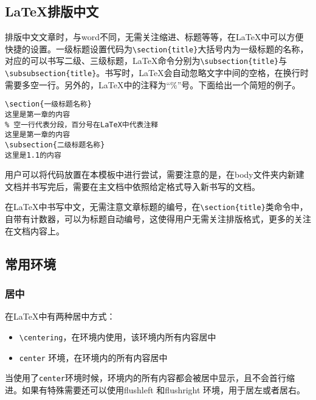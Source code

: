 \subsection{\LaTeX 排版中文}
排版中文文章时，与word不同，无需关注缩进、标题等等，在\LaTeX 中可以方便快捷的设置。一级标题设置代码为\verb|\section{title}|大括号内为一级标题的名称，对应的可以书写二级、三级标题，\LaTeX 命令分别为\verb|\subsection{title}|与\verb|\subsubsection{title}|。书写时，\LaTeX 会自动忽略文字中间的空格，在换行时需要多空一行。另外的，\LaTeX 中的注释为“\%”号。下面给出一个简短的例子。
\begin{verbatim}
\section{一级标题名称}
这里是第一章的内容
% 空一行代表分段，百分号在LaTeX中代表注释
这里是第一章的内容
\subsection{二级标题名称}
这里是1.1的内容
\end{verbatim}

用户可以将代码放置在本模板中进行尝试，需要注意的是，在body文件夹内新建文档并书写完后，需要在主文档中依照给定格式导入新书写的文档。

在\LaTeX 中书写中文，无需注意文章标题的编号，在\verb|\section{title}|类命令中，自带有计数器，可以为标题自动编号，这使得用户无需关注排版格式，更多的关注在文档内容上。
\subsection{常用环境}
\subsubsection{居中}
在\LaTeX 中有两种居中方式：
\begin{itemize}
\item \verb|\centering|，在环境内使用，该环境内所有内容居中
\item \verb|center| 环境，在环境内的所有内容居中
\end{itemize}
\begin{center}
当使用了\verb|center|环境时候，环境内的所有内容都会被居中显示，且不会首行缩进。如果有特殊需要还可以使用flushleft 和flushright 环境，用于居左或者居右。
\end{center}
